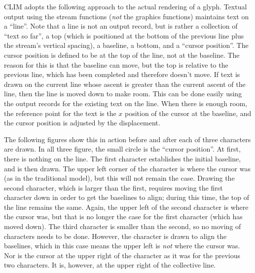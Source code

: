 CLIM adopts the following approach to the actual rendering of a glyph.  Textual
output using the stream functions ({\sl not} the graphics functions) maintains
text on a ``line''.   Note that a line is not an output record, but is rather a
collection of ``text so far'', a top (which is positioned at the bottom of the
previous line plus the stream's vertical spacing), a baseline, a bottom, and a
``cursor position''.  The cursor position is defined to be at the top of the
line, not at the baseline.  The reason for this is that the baseline can move,
but the top is relative to the previous line, which has been completed and
therefore doesn't move.  If text is drawn on the current line whose ascent is
greater than the current ascent of the line, then the line is moved down to make
room.  This can be done easily using the output records for the existing text on
the line.  When there is enough room, the reference point for the text is the
$x$ position of the cursor at the baseline, and the cursor position is adjusted
by the displacement.

The following figures show this in action before and after each of three
characters are drawn.  In all three figure, the small circle is the ``cursor
position''.  At first, there is nothing on the line.  The first character
establishes the initial baseline, and is then drawn.  The upper left corner of
the character is where the cursor was (as in the traditional model), but this
will not remain the case.  Drawing the second character, which is larger than
the first, requires moving the first character down in order to get the
baselines to align; during this time, the top of the line remains the same.
Again, the upper left of the second character is where the cursor was, but that
is no longer the case for the first character (which has moved down).  The third
character is smaller than the second, so no moving of characters needs to be
done.  However, the character is drawn to align the baselines, which in this
case means the upper left is {\sl not} where the cursor was.  Nor is the cursor
at the upper right of the character as it was for the previous two characters.
It is, however, at the upper right of the collective line.

